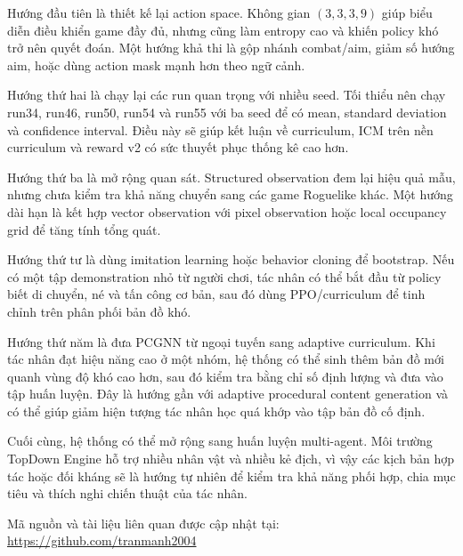 Hướng đầu tiên là thiết kế lại action space. Không gian $(3,3,3,9)$ giúp biểu diễn điều khiển game đầy đủ, nhưng cũng làm entropy cao và khiến policy khó trở nên quyết đoán. Một hướng khả thi là gộp nhánh combat/aim, giảm số hướng aim, hoặc dùng action mask mạnh hơn theo ngữ cảnh.

Hướng thứ hai là chạy lại các run quan trọng với nhiều seed. Tối thiểu nên chạy run34, run46, run50, run54 và run55 với ba seed để có mean, standard deviation và confidence interval. Điều này sẽ giúp kết luận về curriculum, ICM trên nền curriculum và reward v2 có sức thuyết phục thống kê cao hơn.

Hướng thứ ba là mở rộng quan sát. Structured observation đem lại hiệu quả mẫu, nhưng chưa kiểm tra khả năng chuyển sang các game Roguelike khác. Một hướng dài hạn là kết hợp vector observation với pixel observation hoặc local occupancy grid để tăng tính tổng quát.

Hướng thứ tư là dùng imitation learning hoặc behavior cloning để bootstrap. Nếu có một tập demonstration nhỏ từ người chơi, tác nhân có thể bắt đầu từ policy biết di chuyển, né và tấn công cơ bản, sau đó dùng PPO/curriculum để tinh chỉnh trên phân phối bản đồ khó.

Hướng thứ năm là đưa PCGNN từ ngoại tuyến sang adaptive curriculum. Khi tác nhân đạt hiệu năng cao ở một nhóm, hệ thống có thể sinh thêm bản đồ mới quanh vùng độ khó cao hơn, sau đó kiểm tra bằng chỉ số định lượng và đưa vào tập huấn luyện. Đây là hướng gần với adaptive procedural content generation và có thể giúp giảm hiện tượng tác nhân học quá khớp vào tập bản đồ cố định.

Cuối cùng, hệ thống có thể mở rộng sang huấn luyện multi-agent. Môi trường TopDown Engine hỗ trợ nhiều nhân vật và nhiều kẻ địch, vì vậy các kịch bản hợp tác hoặc đối kháng sẽ là hướng tự nhiên để kiểm tra khả năng phối hợp, chia mục tiêu và thích nghi chiến thuật của tác nhân.

Mã nguồn và tài liệu liên quan được cập nhật tại:
\url{https://github.com/tranmanh2004}
